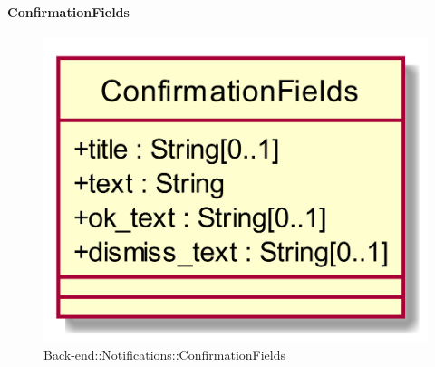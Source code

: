\hypertarget{ConfirmationFields_label}{\paragraph{ConfirmationFields}}
\begin{figure}[h]
	\centering
	\includegraphics[width=\textwidth,height=\textheight,keepaspectratio]{images/ClassConfirmationFields.png}
	\caption{Back-end::Notifications::ConfirmationFields}
\end{figure}
